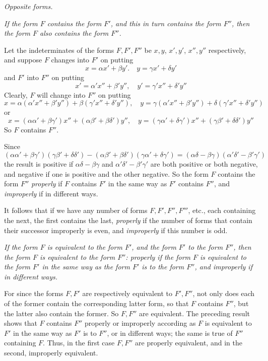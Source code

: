 \begin{center}
\textit{Opposite forms.}
\end{center}

\textit{If the form $F$ contains the form $F'$, and this in turn contains the form $F''$, then the form $F$ also contains the form $F''$.}

Let the indeterminates of the forms $F,F',F''$ be $x,y$, $x',y'$, $x'',y''$ respectively, and suppose $F$ changes into $F'$ on putting
\[
x=\alpha x'+\beta y'.\quad y=\gamma x'+\delta y'
\]
and $F'$ into $F''$ on putting
\[
x'=\alpha'x''+\beta'y'',\quad y'=\gamma'x''+\delta'y''
\]
Clearly, $F$ will change into $F''$ on putting
\[
x=\alpha(\alpha'x''+\beta'y'')+\beta(\gamma'x''+\delta'y''),\quad
y=\gamma(\alpha'x''+\beta'y'')+\delta(\gamma'x''+\delta'y'')
\]
or
\[
x=(\alpha\alpha'+\beta\gamma')x''+(\alpha\beta'+\beta\delta')y'',\quad
y=(\gamma\alpha'+\delta\gamma')x''+(\gamma\beta'+\delta\delta')y''
\]
So $F$ contains $F''$.

Since
\[
(\alpha\alpha'+\beta\gamma')(\gamma\beta'+\delta\delta')
 -(\alpha\beta'+\beta\delta')(\gamma\alpha'+\delta\gamma')
 =(\alpha\delta-\beta\gamma)(\alpha'\delta'-\beta'\gamma')
\]
the result is positive if $\alpha\delta-\beta\gamma$ and $\alpha'\delta'-\beta'\gamma'$ are both positive or both negative, and negative if one is positive and the other negative. So the form $F$ contains the form $F''$ \textit{properly} if $F$ contains $F'$ in the same way as $F'$ contains $F''$, and \textit{improperly} if in different ways.

It follows that if we have any number of forms $F,F',F'',F'''$, etc., each containing the next, the first contains the last, \textit{properly} if the number of forms that contain their successor improperly is even, and \textit{improperly} if this number is odd.

\textit{If the form $F$ is equivalent to the form $F'$, and the form $F'$ to the form $F''$, then the form $F$ is equivalent to the form $F''$: properly if the form $F$ is equivalent to the form $F'$ in the same way as the form $F'$ is to the form $F''$, and improperly if in different ways.}

For since the forms $F,F'$ are respectively equivalent to $F',F''$, not only does each of the former contain the corresponding latter form, so that $F$ contains $F''$, but the latter also contain the former. So $F,F''$ are equivalent. The preceding result shows that $F$ contains $F''$ properly or improperly according as $F$ is equivalent to $F'$ in the same way as $F'$ is to $F''$, or in different ways; the same is true of $F''$ containing $F$. Thus, in the first case $F,F''$ are properly equivalent, and in the second, improperly equivalent.

